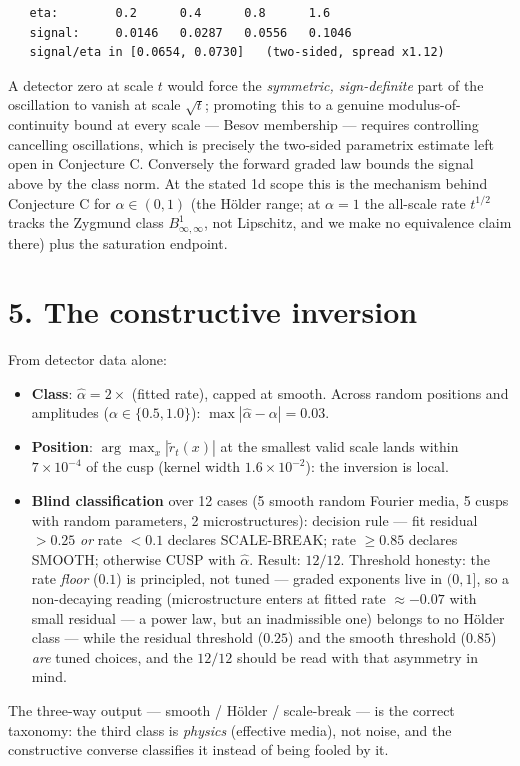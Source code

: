 \documentclass[11pt]{article}
\begin{document}
\begin{small}\begin{verbatim}
   eta:        0.2      0.4      0.8      1.6
   signal:     0.0146   0.0287   0.0556   0.1046
   signal/eta in [0.0654, 0.0730]   (two-sided, spread x1.12)
\end{verbatim}\end{small}
A detector zero at scale $t$ would force the \emph{symmetric, sign-definite} part of the oscillation to vanish at scale $\sqrt t$; promoting this to a genuine modulus-of-continuity bound at every scale — Besov membership — requires controlling cancelling oscillations, which is precisely the two-sided parametrix estimate left open in Conjecture C.  Conversely the forward graded law bounds the signal above by the class norm.  At the stated 1d scope this is the mechanism behind Conjecture C for $\alpha \in (0, 1)$ (the Hölder range; at $\alpha = 1$ the all-scale rate $t^{1/2}$ tracks the Zygmund class $B^1_{\infty,\infty}$, not Lipschitz, and we make no equivalence claim there) plus the saturation endpoint.

\section*{5. The constructive inversion}
From detector data alone:

\begin{itemize}
\item \textbf{Class}: $\hat\alpha = 2\times$ (fitted rate), capped at smooth. Across random positions and amplitudes ($\alpha \in \{0.5, 1.0\}$): $\max|\hat\alpha - \alpha| = 0.03$.
\item \textbf{Position}: $\arg\max_x |\tilde r_t(x)|$ at the smallest valid scale lands within $7\times 10^{-4}$ of the cusp (kernel width $1.6\times 10^{-2}$): the inversion is local.
\item \textbf{Blind classification} over 12 cases (5 smooth random Fourier media, 5 cusps with random parameters, 2 microstructures): decision rule — fit residual $> 0.25$ \emph{or} rate $< 0.1$ declares SCALE-BREAK; rate $\ge 0.85$ declares SMOOTH; otherwise CUSP with $\hat\alpha$.  Result: $12/12$.  Threshold honesty: the rate \emph{floor} ($0.1$) is principled, not tuned — graded exponents live in $(0,1]$, so a non-decaying reading (microstructure enters at fitted rate $\approx -0.07$ with small residual — a power law, but an inadmissible one) belongs to no Hölder class — while the residual threshold ($0.25$) and the smooth threshold ($0.85$) \emph{are} tuned choices, and the $12/12$ should be read with that asymmetry in mind.
\end{itemize}
The three-way output — smooth / Hölder / scale-break — is the correct taxonomy: the third class is \emph{physics} (effective media), not noise, and the constructive converse classifies it instead of being fooled by it.
\end{document}
